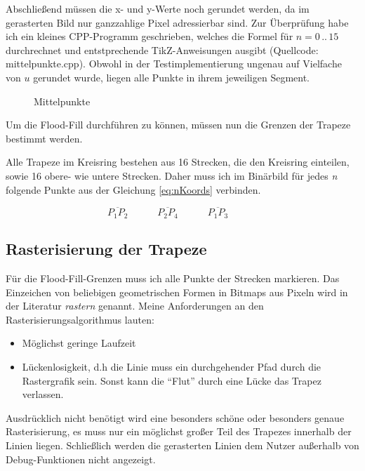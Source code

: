Abschließend müssen die x- und y-Werte noch gerundet werden, da im gerasterten Bild nur ganzzahlige Pixel adressierbar sind.
Zur Überprüfung habe ich ein kleines CPP-Programm geschrieben, welches die Formel für \(n = 0\hspace{2pt}..\hspace{2pt}15 \) durchrechnet und entstprechende TikZ-Anweisungen ausgibt (Quellcode: mittelpunkte.cpp). Obwohl in der Testimplementierung ungenau auf Vielfache von \(u\) gerundet wurde, liegen alle Punkte in ihrem jeweiligen Segment.

\begin{figure}[!ht]
	\centering
	
	\caption{Mittelpunkte}
\end{figure}

Um die Flood-Fill durchführen zu können, müssen nun die Grenzen der Trapeze bestimmt werden. 

Alle Trapeze im Kreisring bestehen aus 16 Strecken, die den Kreisring einteilen, sowie 16 obere- wie untere Strecken. Daher muss ich im Binärbild für jedes \textit{n} folgende Punkte aus der Gleichung \eqref{eq:nKoords} verbinden.
	
\begin{equation}
	\overline{P_1P_2} \hspace{3em}
	\overline{P_2P_4} \hspace{3em}
	\overline{P_1P_3} \hspace{3em}
\end{equation}

\subsection{Rasterisierung der Trapeze}
Für die Flood-Fill-Grenzen muss ich alle Punkte der Strecken markieren. Das Einzeichen von beliebigen geometrischen Formen in Bitmaps aus Pixeln wird in der Literatur \textit{rastern} genannt. Meine Anforderungen an den Rasterisierungsalgorithmus lauten:
\begin{itemize}
	\item Möglichst geringe Laufzeit
	\item Lückenlosigkeit, d.h die Linie muss ein durchgehender Pfad durch die Rastergrafik sein. Sonst kann die "`Flut"' durch eine Lücke das Trapez verlassen.
\end{itemize}
Ausdrücklich nicht benötigt wird eine besonders schöne oder besonders genaue Rasterisierung, es muss nur ein möglichst großer Teil des Trapezes innerhalb der Linien liegen. Schließlich werden die gerasterten Linien dem Nutzer außerhalb von Debug-Funktionen nicht angezeigt.

